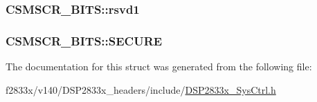 \subsubsection[{rsvd1}]{ C\+S\+M\+S\+C\+R\+\_\+\+B\+I\+T\+S\+::rsvd1}\label{struct_c_s_m_s_c_r___b_i_t_s_a231f9bcb4cec686eda3df920afc80b3a}
\hypertarget{struct_c_s_m_s_c_r___b_i_t_s_af9a8d39bcfe9f90add69b261eb25b795}{}
\subsubsection[{S\+E\+C\+U\+R\+E}]{ C\+S\+M\+S\+C\+R\+\_\+\+B\+I\+T\+S\+::\+S\+E\+C\+U\+R\+E}\label{struct_c_s_m_s_c_r___b_i_t_s_af9a8d39bcfe9f90add69b261eb25b795}


The documentation for this struct was generated from the following file\+:\begin{DoxyCompactItemize}
\item 
f2833x/v140/\+D\+S\+P2833x\+\_\+headers/include/\hyperlink{_d_s_p2833x___sys_ctrl_8h}{D\+S\+P2833x\+\_\+\+Sys\+Ctrl.\+h}\end{DoxyCompactItemize}
